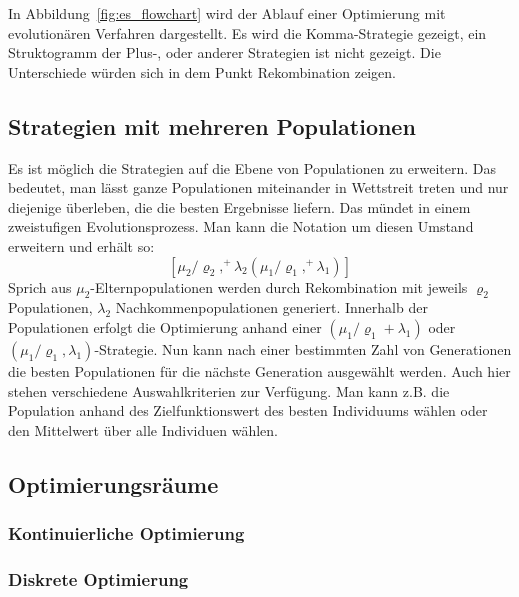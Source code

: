 In Abbildung~\ref{fig:es_flowchart} wird der Ablauf einer Optimierung mit evolutionären Verfahren dargestellt. Es wird die Komma-Strategie gezeigt, ein Struktogramm der Plus-, oder anderer Strategien ist nicht gezeigt. Die Unterschiede würden sich in dem Punkt Rekombination zeigen.
%


\subsection{Strategien mit mehreren Populationen}
Es ist möglich die Strategien auf die Ebene von Populationen zu erweitern. Das bedeutet, man lässt ganze Populationen miteinander in Wettstreit treten und nur diejenige überleben, die die besten Ergebnisse liefern. Das mündet in einem zweistufigen Evolutionsprozess. Man kann die Notation um diesen Umstand erweitern und erhält so:
$$
[\mu_2/\varrho_2,^{+}\lambda_2(\mu_1/\varrho_1,^{+}\lambda_1)]
$$
Sprich aus $\mu_2$-Elternpopulationen werden durch Rekombination mit jeweils $\varrho_2$ Populationen, $\lambda_2$ Nachkommenpopulationen generiert. Innerhalb der Populationen erfolgt die Optimierung anhand einer $({\mu_1}/{\varrho_1}+\lambda_1)$ oder $({\mu_1}/{\varrho_1},\lambda_1)$-Strategie. Nun kann nach einer bestimmten Zahl von Generationen die besten Populationen für die nächste Generation ausgewählt werden. Auch hier stehen verschiedene Auswahlkriterien zur Verfügung. Man kann z.B. die Population anhand des Zielfunktionswert des besten Individuums wählen oder den Mittelwert über alle Individuen wählen.
%
\subsection{Optimierungsräume}
\lipsum[1]
%
\subsubsection{Kontinuierliche Optimierung}
%
\lipsum[1]
%
\subsubsection{Diskrete Optimierung}
%
\lipsum[1]
%
